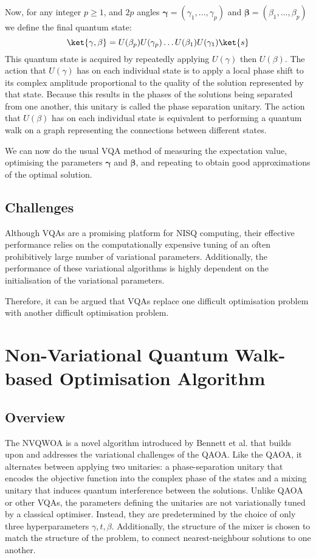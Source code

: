 Now, for any integer $p\geq1$, and $2p$ angles $\mathbf{\gamma}=(\gamma_1, ...,\gamma_p)$ and $\mathbf{\beta}=(\beta_1, ...,\beta_p)$ we define the final quantum state:
$$\ket{\mathbf{\gamma},\mathbf{\beta}}=U(\beta_p)U(\gamma_p)\dots U(\beta_1)U(\gamma_1) \ket{s}$$
This quantum state is acquired by repeatedly applying $U(\gamma)$ then $U(\beta)$. The action that $U(\gamma)$ has on each individual state is to apply a local phase shift to its complex amplitude proportional to the quality of the solution represented by that state. Because this results in the phases of the solutions being separated from one another, this unitary is called the phase separation unitary. The action that $U(\beta)$ has on each individual state is equivalent to performing a quantum walk on a graph representing the connections between different states.

We can now do the usual VQA method of measuring the expectation value, optimising the parameters $\mathbf{\gamma}$ and $\mathbf{\beta}$, and repeating to obtain good approximations of the optimal solution.

\subsection{Challenges}
Although VQAs are a promising platform for NISQ computing, their effective performance relies on the computationally expensive tuning of an often prohibitively large number of variational parameters. Additionally, the performance of these variational algorithms is highly dependent on the initialisation of the variational parameters.

Therefore, it can be argued that VQAs replace one difficult optimisation problem with another difficult optimisation problem.

\section{Non-Variational Quantum Walk-based Optimisation Algorithm}\label{sec:NVQWOA}
\subsection{Overview}
The NVQWOA is a novel algorithm introduced by Bennett et al. that builds upon and addresses the variational challenges of the QAOA\cite{bennett2024nonvariational,bennett2024analysisnonvariationalquantumwalkbased}. 
Like the QAOA, it alternates between applying two unitaries: a phase-separation unitary that encodes the objective function into the complex phase of the states and a mixing unitary that induces quantum interference between the solutions. Unlike QAOA or other VQAs, the parameters defining the unitaries are not variationally tuned by a classical optimiser. Instead, they are predetermined by the choice of only three hyperparameters $\gamma, t, \beta$. Additionally, the structure of the mixer is chosen to match the structure of the problem, to connect nearest-neighbour solutions to one another.


